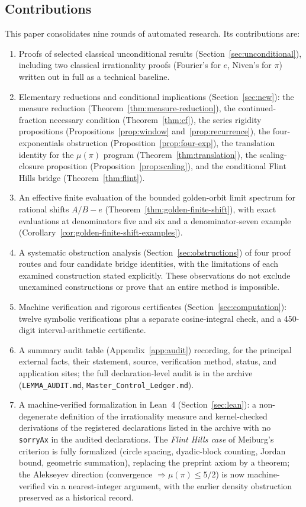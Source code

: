 \documentclass[11pt]{amsart}
\theoremstyle{definition}
\theoremstyle{remark}
\numberwithin{equation}{section}
\newcommand{\irr}{\mu}
\newcommand{\ee}{e}
\begin{document}
\subsection{Contributions} This paper consolidates nine rounds of automated research. Its contributions are:
\begin{enumerate}
\item Proofs of selected classical unconditional results (Section~\ref{sec:unconditional}), including two classical irrationality proofs (Fourier's for $\ee$, Niven's for $\pi$) written out in full as a technical baseline.
\item Elementary reductions and conditional implications (Section~\ref{sec:new}): the measure reduction (Theorem~\ref{thm:measure-reduction}), the continued-fraction necessary condition (Theorem~\ref{thm:cf}), the series rigidity propositions (Propositions~\ref{prop:window} and~\ref{prop:recurrence}), the four-exponentials obstruction (Proposition~\ref{prop:four-exp}), the translation identity for the $\irr(\pi)$ program (Theorem~\ref{thm:translation}), the scaling-closure proposition (Proposition~\ref{prop:scaling}), and the conditional Flint Hills bridge (Theorem~\ref{thm:flint}).
\item An effective finite evaluation of the bounded golden-orbit limit
spectrum for rational shifts $A/B-e$ (Theorem~\ref{thm:golden-finite-shift}),
with exact evaluations at denominators five and six and a denominator-seven
example (Corollary~\ref{cor:golden-finite-shift-examples}).
\item A systematic obstruction analysis (Section~\ref{sec:obstructions}) of four proof routes and four candidate bridge identities, with the limitations of each examined construction stated explicitly. These observations do not exclude unexamined constructions or prove that an entire method is impossible.
\item Machine verification and rigorous certificates (Section~\ref{sec:computation}): twelve symbolic verifications plus a separate cosine-integral check, and a 450-digit interval-arithmetic certificate.
\item A summary audit table (Appendix~\ref{app:audit}) recording, for the principal external facts, their statement, source, verification method, status, and application sites; the full declaration-level audit is in the archive (\texttt{LEMMA\_AUDIT.md}, \texttt{Master\_Control\_Ledger.md}).
\item A machine-verified formalization in Lean~4 (Section~\ref{sec:lean}): a non-degenerate definition of the irrationality measure and kernel-checked derivations of the registered declarations listed in the archive with no \texttt{sorryAx} in the audited declarations. The \emph{Flint Hills case} of Meiburg's criterion is fully formalized (circle spacing, dyadic-block counting, Jordan bound, geometric summation), replacing the preprint axiom by a theorem; the Alekseyev direction (convergence $\Rightarrow\irr(\pi)\le5/2$) is now machine-verified via a nearest-integer argument, with the earlier density obstruction preserved as a historical record.

\end{enumerate}
\end{document}
